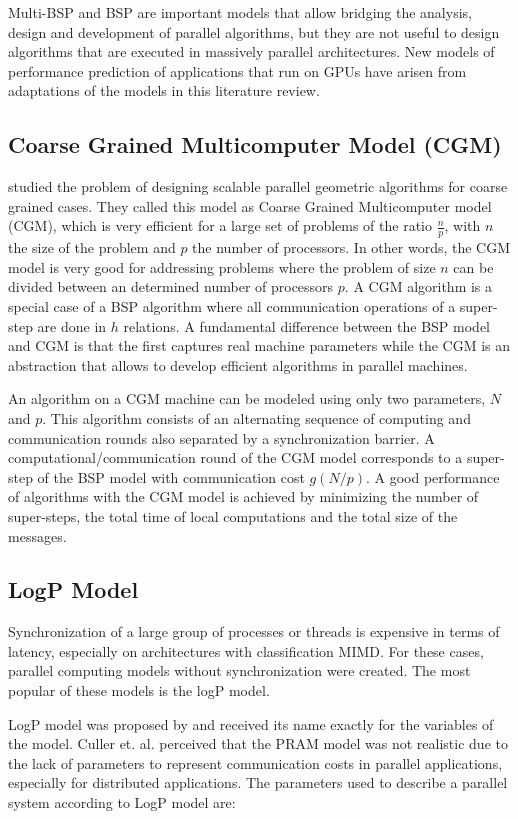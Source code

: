 Multi-BSP and BSP are important models that allow bridging the analysis, design and development of parallel algorithms, but they are not useful to design algorithms that are executed in massively parallel architectures. New models of performance prediction of applications that run on GPUs have arisen from adaptations of the models in this literature review.

\subsection{Coarse Grained Multicomputer Model (CGM)}
\cite{Dehne:2002} studied the problem of designing scalable parallel geometric algorithms for coarse grained cases. They called this model as Coarse Grained Multicomputer model (CGM), which is very efficient for a large set of problems of the ratio $\frac{n}{p}$, with $n$ the size of the problem and $p$ the number of processors. In other words, the CGM model is very good for addressing problems where the problem of size $n$ can be divided between an determined number of processors $p$. A CGM algorithm is a special case of a BSP algorithm where all communication operations of a super-step are done in $h$ relations. A fundamental difference between the BSP model and CGM is that the first captures real machine parameters while the CGM is an abstraction that allows to develop efficient algorithms in parallel machines.

An algorithm on a CGM machine can be modeled using only two parameters, $N$ and $p$. This algorithm consists of an alternating sequence of computing and communication rounds also separated by a synchronization barrier. A computational/communication round of the CGM model corresponds to a super-step of the BSP model with communication cost $g(N/p)$. A good performance of algorithms with the CGM model is achieved by minimizing the number of super-steps, the total time of local computations and the total size of the messages.

\subsection{LogP Model}
Synchronization of a large group of processes or threads is expensive in terms of latency, especially on architectures with classification MIMD. For these cases, parallel computing models without synchronization were created. The most popular of these models is the logP model.

LogP model was proposed by \citet{Culler:1993:LogP} and received its name exactly for the variables of the model. Culler et. al. perceived that the PRAM model was not realistic due to the lack of parameters to represent communication costs in parallel applications, especially for distributed applications. The parameters used to describe a parallel system according to LogP model are:

